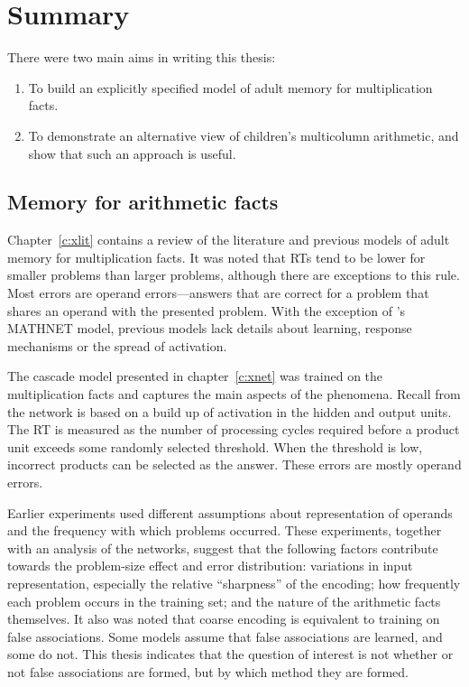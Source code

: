 \chapter{Summary}

There were two main aims in writing this thesis:

\begin{enumerate}

\item To build an explicitly specified model of adult memory for
multiplication facts.

\item To demonstrate an alternative view of children's multicolumn
arithmetic, and show that such an approach is useful.

\end{enumerate}


\section{Memory for arithmetic facts}

Chapter~\ref{c:xlit} contains a review
of the literature and previous models of adult
memory for multiplication facts.  It was noted that RTs tend to be lower
for smaller problems than larger problems, although there are exceptions to
this rule.  Most errors are operand errors---answers that are correct for a
problem that shares an operand with the presented problem.  With the
exception of \citeauthor{mcclmath}'s MATHNET model, previous models lack
details about learning, response mechanisms or the spread of activation.

The cascade model presented in chapter~\ref{c:xnet} was trained on the
multiplication facts and captures the main aspects of the phenomena. Recall
from the network is based on a build up of activation in the hidden and
output units.  The RT is measured as the number of processing cycles
required before a
product unit exceeds some randomly selected threshold.  When the threshold
is low, incorrect products can be selected as the answer.  These errors are
mostly operand errors.

Earlier experiments used different assumptions about representation of
operands and the frequency with which problems occurred.  These experiments,
together with an analysis of the networks, suggest that the following
factors contribute towards the problem-size effect and error distribution:
variations in input representation, especially the relative ``sharpness''
of the encoding; how frequently each problem occurs in the training set;
and the nature of the arithmetic facts themselves.
It also was noted that coarse encoding is equivalent to training on false
associations.  Some models assume that false associations are learned,
and some do not.  This thesis indicates that the question of interest is
not whether or not false associations are formed, but by which method they
are formed.

